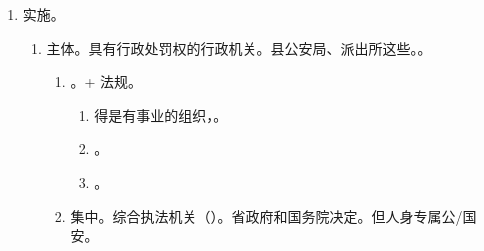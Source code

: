 \begin{enumerate}
\begin{enumerate}
\begin{enumerate}
                  \item {}。地方性法规。除吊销营业执照（法人是全国的）、其他种类（新花样）。
                  \item {}。数额国务院/省人常定 \yjt 其他能自定{（）}。要能举一反三。
                \end{enumerate}
          \item {}。从粗到细，下位法上位法，但是上位法。。
                \begin{enumerate}
                  \item 不能抵触上位法处罚的。。
                  \item 细化这个区间。。
                \end{enumerate}
          \item 补充规定/补充设定。从有到全。仅法规可以补充规定。
                \begin{enumerate}
                  \item 完整的结构 = 行为模式/条件模式 + 后果模式/责任模式。
                  \item 把缺失了的法条结构补完整。
                \end{enumerate}
        \end{enumerate}
  \item 实施。
        \begin{enumerate}
          \item 主体。具有行政处罚权的行政机关。县公安局、派出所这些。。
                \begin{enumerate}
                  \item {}。+ 法规。
                        \begin{enumerate}
                          \item 得是有事业的组织，。
                          \item {}。
                          \item {}。
                        \end{enumerate}
                  \item 集中。综合执法机关（）。省政府和国务院决定。但人身专属公/国安。
                \end{enumerate}

\end{enumerate}
\end{enumerate}
